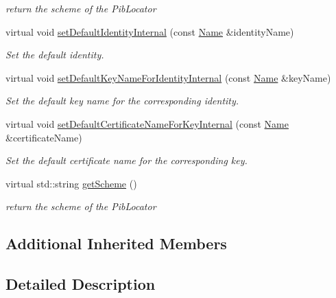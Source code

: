 \begin{DoxyCompactItemize}
\begin{DoxyCompactList}\small\item\em return the scheme of the Pib\+Locator \end{DoxyCompactList}\item 
virtual void \hyperlink{classndn_1_1security_1_1DummyPublicInfo_a4e306faeff8ccc149b62aec02c6b7560}{set\+Default\+Identity\+Internal} (const \hyperlink{classndn_1_1Name}{Name} \&identity\+Name)
\begin{DoxyCompactList}\small\item\em Set the default identity. \end{DoxyCompactList}\item 
virtual void \hyperlink{classndn_1_1security_1_1DummyPublicInfo_aaa635ecfa48c85237884515d0d948189}{set\+Default\+Key\+Name\+For\+Identity\+Internal} (const \hyperlink{classndn_1_1Name}{Name} \&key\+Name)
\begin{DoxyCompactList}\small\item\em Set the default key name for the corresponding identity. \end{DoxyCompactList}\item 
virtual void \hyperlink{classndn_1_1security_1_1DummyPublicInfo_a7ec5fa57e99ac2338316b389541af4a5}{set\+Default\+Certificate\+Name\+For\+Key\+Internal} (const \hyperlink{classndn_1_1Name}{Name} \&certificate\+Name)
\begin{DoxyCompactList}\small\item\em Set the default certificate name for the corresponding key. \end{DoxyCompactList}\item 
virtual std\+::string \hyperlink{classndn_1_1security_1_1DummyPublicInfo_a8fc49c8efd4853248fed6924d37a915a}{get\+Scheme} ()\hypertarget{classndn_1_1security_1_1DummyPublicInfo_a8fc49c8efd4853248fed6924d37a915a}{}\label{classndn_1_1security_1_1DummyPublicInfo_a8fc49c8efd4853248fed6924d37a915a}

\begin{DoxyCompactList}\small\item\em return the scheme of the Pib\+Locator \end{DoxyCompactList}\end{DoxyCompactItemize}
\subsection*{Additional Inherited Members}


\subsection{Detailed Description}



